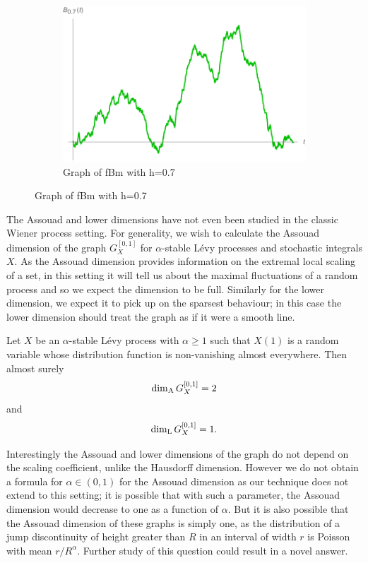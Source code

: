 \begin{figure}[h]
\begin{subfigure}[b]{0.3\textwidth}
		\includegraphics[width=\textwidth]{pics/ch-brownian/fbm0_7.pdf}
		\caption{Graph of fBm with h=0.7}
		\label{fig:fbm7}
	\end{subfigure}
\end{figure}


The Assouad and lower dimensions have not even been studied in the classic Wiener process setting. For generality, we wish to calculate the Assouad dimension of the graph $G_X^{[0,1]}$ for $\alpha$-stable L\'{e}vy processes and stochastic integrals $X$. As the Assouad dimension provides information on the extremal local scaling of a set, in this setting it will tell us about the maximal fluctuations of a random process and so we expect the dimension to be full. Similarly for the lower dimension, we expect it to pick up on the sparsest behaviour; in this case the lower dimension should treat the graph as if it were a smooth line.


\begin{theorem}\label{Main}
	Let $X$ be an $\alpha$-stable L\'evy process with $\alpha \geq 1$ such that $X(1)$ is a random variable whose distribution function is non-vanishing almost everywhere. Then almost surely
	\[
	\dim_{\textup{A}} G_{X}^{[0,1]} = 2
	\]
	and 
	\[ 
	\dim_{\textup{L}} G_{X}^{[0,1]} = 1.
	\]
\end{theorem}

Interestingly the Assouad and lower dimensions of the graph do not depend on the scaling coefficient, unlike the Hausdorff dimension. However we do not obtain a formula for $\alpha \in (0,1)$ for the Assouad dimension as our technique does not extend to this setting; it is possible that with such a parameter, the Assouad dimension would decrease to one as a function of $\alpha$. But it is also possible that the Assouad dimension of these graphs is simply one, as the distribution of a jump discontinuity of height greater than $R$ in an interval of width $r$ is Poisson with mean $r/R^\alpha$. Further study of this question could result in a novel answer.

